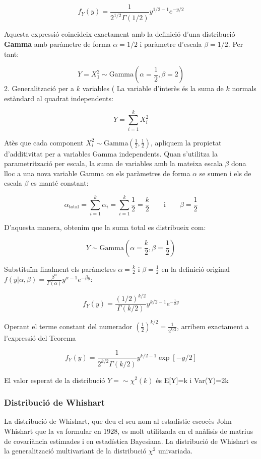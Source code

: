 \documentclass[
  catalan,
]{article}
\theoremstyle{definition}
\theoremstyle{definition}
\theoremstyle{definition}
\theoremstyle{definition}
\theoremstyle{remark}
\begin{document}
\[f_Y(y) = \frac{1}{2^{1/2} \Gamma(1/2)} y^{1/2 - 1} e^{-y/2}\]

Aquesta expressió coincideix exactament amb la definició d'una distribució \textbf{Gamma} amb paràmetre de forma \(\alpha = 1/2\) i paràmetre d'escala \(\beta = 1/2\). Per tant:

\[Y = X_1^2 \sim \text{Gamma}\left(\alpha = \frac{1}{2}, \beta = 2\right)\]
2. Generalització per a \(k\) variables (
La variable d'interès és la suma de \(k\) normals estàndard al quadrat independents:

\[Y = \sum_{i=1}^{k} X_i^2\]

Atès que cada component \(X_i^2 \sim \text{Gamma}\left(\frac{1}{2}, \frac{1}{2}\right)\), apliquem la propietat d'additivitat per a variables Gamma independents. Quan s'utilitza la parametrització per escala, la suma de variables amb la mateixa escala \(\beta\) dona lloc a una nova variable Gamma on els paràmetres de forma \(\alpha\) se sumen i els de escala \(\beta\) es manté constant:

\[\alpha_{\text{total}} = \sum_{i=1}^{k} \alpha_i = \sum_{i=1}^{k} \frac{1}{2} = \frac{k}{2} \qquad \text{i} \qquad \beta = \frac{1}{2}\]

D'aquesta manera, obtenim que la suma total es distribueix com:

\[Y \sim \text{Gamma}\left(\alpha = \frac{k}{2}, \beta = \frac{1}{2}\right)\]

Substituïm finalment els paràmetres \(\alpha = \frac{k}{2}\) i \(\beta = \frac{1}{2}\) en la definició original \(f(y|\alpha, \beta) = \frac{\beta^\alpha}{\Gamma(\alpha)} y^{\alpha-1} e^{-\beta y}\):

\[f_Y(y) = \frac{(1/2)^{k/2}}{\Gamma(k/2)} y^{k/2 - 1} e^{-\frac{1}{2}y}\]

Operant el terme constant del numerador \(\left(\frac{1}{2}\right)^{k/2} = \frac{1}{2^{k/2}}\), arribem exactament a l'expressió del Teorema

\[f_Y(y) = \frac{1}{2^{k/2} \Gamma(k/2)} y^{k/2 - 1} \exp[-y/2]\]

El valor esperat de la distribució \(Y= \sim \chi^2(k)\) és E{[}Y{]}=k i Var(Y)=2k

\subsubsection{Distribució de Whishart}\label{distribuciuxf3-de-whishart}

La distribució de Whishart, que deu el seu nom al estadístic escocès John Whishart que la va formular en 1928, es molt utilitzada en el anàlisis de matrius de covariància estimades i en estadística Bayesiana. La distribució de Whishart es la generalització multivariant de la distribució \(\chi^2\) univariada.
\end{document}

